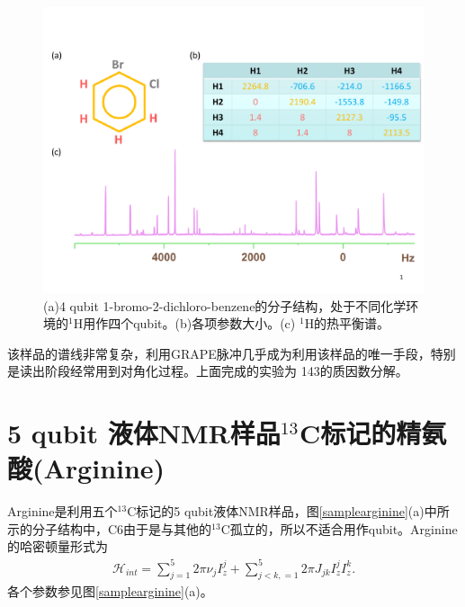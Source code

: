 \begin{figure}[htbp]
            \begin{center}
              \includegraphics[width= 0.8\columnwidth]{figures/samplelq4.pdf}
              \caption{(a)4 qubit 1-bromo-2-dichloro-benzene的分子结构，处于不同化学环境的$^{1}$H用作四个qubit。(b)各项参数大小。(c) $^{1}$H的热平衡谱。}
              \label{samplelq4}
            \end{center}
\end{figure}

该样品的谱线非常复杂，利用GRAPE脉冲几乎成为利用该样品的唯一手段，特别是读出阶段经常用到对角化过程。上面完成的实验为
143的质因数分解\cite{shor143}。

\section{5 qubit 液体NMR样品$^{13}$C标记的精氨酸(Arginine)}

Arginine是利用五个$^{13}$C标记的5 qubit液体NMR样品，图\ref{samplearginine}(a)中所示的分子结构中，C6由于是与其他的$^{13}$C孤立的，所以不适合用作qubit。Arginine的哈密顿量形式为
\begin{eqnarray}
\mathcal{H}_{int}=\sum\limits_{j=1}^5 {2\pi \nu _j } I_z^j  + \sum\limits_{j < k,=1}^5 {2\pi} J_{jk} I_z^j I_z^k.
\end{eqnarray}
各个参数参见图\ref{samplearginine}(a)。

